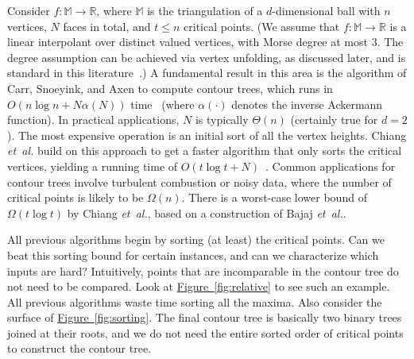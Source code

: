 \documentclass[11pt]{article}
\theoremstyle{definition}
\newcommand{\MM}{\mathbb{M}}
\newcommand{\RR}{\mathbb{R}}
\newcommand{\Fig}[1]{\hyperref[fig:#1]{Figure~\ref*{fig:#1}}} %
\newcommand{\Reminder}[1]{{\color{red}#1}}
\newcommand{\Sesh}[1]{\Reminder{Sesh interjects: #1}}
\newcommand{\etal}{\textit{et~al.}\xspace}
\newcommand{\XSays}[2]{{
      {$\rule[-0.12cm]{0.2in}{0.5cm}$\fbox{\tt
            #1:} }
      \textcolor{red}{#2}
      \marginpar{\textcolor{blue}{#1}}
      {$\rule[0.1cm]{0.3in}{0.1cm}$\fbox{\tt
            end}$\rule[0.1cm]{0.3in}{0.1cm}$}
      }
   }
\renewcommand{\XSays}[2]{}%
\newcommand{\Ben}[1]{{\XSays{Ben}{#1}}}
\begin{document}
Consider $f: \MM \to \RR$, where $\MM$ is the triangulation of a $d$-dimensional ball with $n$ vertices, $N$ faces in total, and $t \leq n$ critical points. 
(We assume that $f:\MM \to \RR$ is a linear interpolant over distinct valued vertices, with Morse degree at most $3$. 
The degree assumption can be achieved via vertex unfolding, as discussed later,
and is standard in this literature~\cite{kobps-ctsssit-97}.)
A fundamental result in this area is the algorithm of Carr, Snoeyink, and Axen to compute contour trees,
which runs in $O(n\log n + N\alpha(N))$ time~\cite{csa-cctad-03} (where $\alpha(\cdot)$ denotes the inverse
Ackermann function). In practical applications, $N$ is typically $\Theta(n)$
(certainly true for $d=2$). The most expensive operation is an initial sort of all the vertex
heights. Chiang \etal build on this approach to get a faster algorithm that only sorts the critical vertices,
yielding a running time of $O(t\log t + N)$~\cite{cllr-sooscctmp-05}.
Common applications for contour trees involve turbulent combustion or noisy data, where the number of critical points is likely to be $\Omega(n)$.
There is a worst-case
lower bound of $\Omega(t\log t)$ by Chiang \etal \cite{cllr-sooscctmp-05}, based on a construction of Bajaj \etal \cite{BaKr+98}.

All previous algorithms begin by sorting (at least) the critical points. Can we beat this sorting bound for certain instances,
and can we characterize which inputs are hard? Intuitively, points that are incomparable in the contour tree
do not need to be compared. Look at \Fig{relative} to see such an example. All previous algorithms waste time
sorting all the maxima. Also consider the surface of \Fig{sorting}. The final contour tree is basically two binary
trees joined at their roots, and we do not need the entire sorted order of critical points
to construct the contour tree. 

\end{document}

